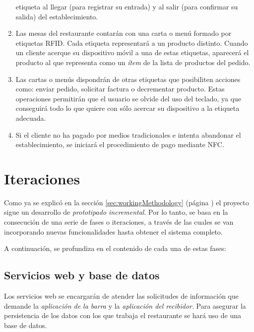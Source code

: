 \begin{enumerate}
etiqueta al llegar (para registrar su entrada) y al salir (para confirmar
su salida) del establecimiento.
\item Las mesas del restaurante contarán con una carta o menú formado por
etiquetas \acs{RFID}. Cada etiqueta representará a un producto distinto.
Cuando un cliente acerque su dispositivo móvil a una de estas etiquetas,
aparecerá el producto al que representa como un \emph{ítem} de la lista de
productos del pedido.
\item Las cartas o menús dispondrán de otras etiquetas que posibiliten acciones
como: enviar pedido, solicitar factura o decrementar producto. Estas
operaciones permitirán que el usuario se olvide del uso del teclado, ya que
conseguirá todo lo que quiere con sólo acercar su dispositivo a la etiqueta
adecuada.
\item Si el cliente no ha pagado por medios tradicionales e intenta abandonar
el establecimiento, se iniciará el procedimiento de pago mediante \acs{NFC}.
\end{enumerate}

\section{Iteraciones}
Como ya se explicó en la sección \ref{sec:workingMethodology} (página
\pageref{sec:workingMethodology}) el proyecto sigue un desarrollo de
\emph{prototipado incremental}. Por lo tanto, se basa en la consecución de una
serie de fases o iteraciones, a través de las cuales se van incorporando nuevas
funcionalidades hasta obtener el sistema completo.

A continuación, se profundiza en el contenido de cada una de estas fases:

\subsection{Servicios web y base de datos}
Los servicios web se encargarán de atender las solicitudes de información que
demande la \emph{aplicación de la barra} y la \emph{aplicación del recibidor}.
Para asegurar la persistencia de los datos con los que trabaja el restaurante
se hará uso de una base de datos.

